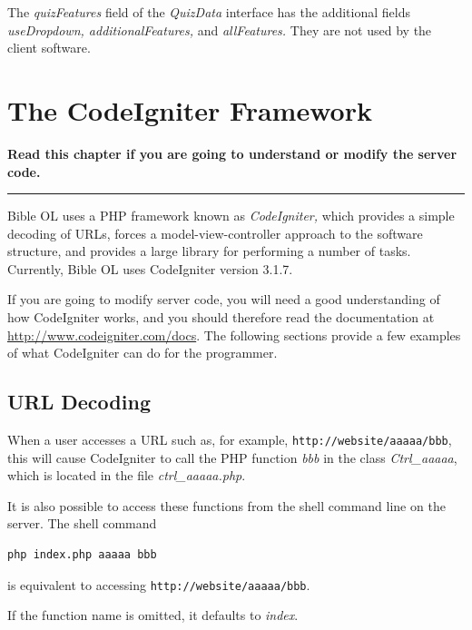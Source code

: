 \documentclass[11pt,oneside,a4paper]{memoir}
\begin{document}
The \emph{quizFeatures} field of the \emph{QuizData} interface has the additional fields
\emph{useDropdown, additionalFeatures,} and \emph{allFeatures.} They are not used by the client
software.


\chapter{The CodeIgniter Framework}\label{chap-codeigniter-use}

\textbf{Read this chapter if you are going to understand or modify the server code.}
\plainbreak{3}

Bible OL uses a PHP framework known as \emph{CodeIgniter,} which provides a simple
decoding of URLs, forces a model-view-controller approach to the software structure, and provides a
large library for performing a number of tasks. Currently, Bible OL uses CodeIgniter version 3.1.7.

If you are going to modify server code, you will need a good understanding of how
CodeIgniter works, and you should therefore read the documentation at
\url{http://www.codeigniter.com/docs}. The following sections provide a few examples of what
CodeIgniter can do for the programmer.

\section{URL Decoding}\label{url-decoding}

When a user accesses a URL such as, for example, \texttt{http://website/aaaaa/bbb}, this will cause
CodeIgniter to call the PHP function \emph{bbb} in the class \emph{Ctrl\_aaaaa}, which is located in
the file \emph{ctrl\_aaaaa.php}.

It is also possible to access these functions from the shell command line on the server. The shell command

\begin{lstlisting}[language=bash]
php index.php aaaaa bbb
\end{lstlisting}

\noindent
is equivalent to accessing \texttt{http://website/aaaaa/bbb}.

If the function name is omitted, it defaults to \emph{index}.
\end{document}
